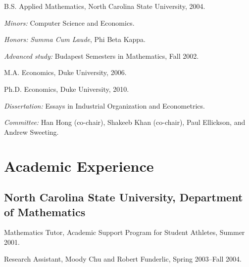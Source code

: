 \documentclass[10pt,letterpaper]{article}
\renewenvironment{itemize}{
  \begin{list}{}{
    \setlength{\leftmargin}{1.5em}
    \setlength{\itemsep}{0.25em}
    \setlength{\parskip}{0pt}
    \setlength{\parsep}{0.25em}
  }
}{
  \end{list}
}
\begin{document}
\begin{itemize}

  \item B.S. Applied Mathematics, North Carolina State University, 2004.

    \begin{itemize}

    \item \textit{Minors:}
      Computer Science and Economics.

    \item \textit{Honors:}
      \textit{Summa Cum Laude}, Phi Beta Kappa.

    \item \textit{Advanced study:}
      Budapest Semesters in Mathematics, Fall 2002.

    \end{itemize}

  \item M.A. Economics, Duke University, 2006.

  \item Ph.D. Economics, Duke University, 2010.

    \begin{itemize}

    \item \textit{Dissertation:}
      Essays in Industrial Organization and Econometrics.

    \item \textit{Committee:}
      Han Hong (co-chair), Shakeeb Khan (co-chair),
      Paul Ellickson, and Andrew Sweeting.

    \end{itemize}

\end{itemize}

\section*{Academic Experience}

\subsection*{North Carolina State University,
  Department of Mathematics}

\begin{itemize}

\item Mathematics Tutor, Academic Support Program for Student Athletes,
  Summer 2001.

\item Research Assistant, Moody Chu and Robert Funderlic,
  Spring 2003--Fall 2004.

\end{itemize}
\end{document}
